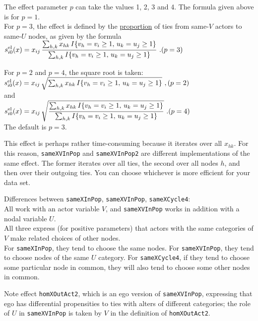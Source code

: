 \documentclass[a4paper,fleqn,11pt]{article}
\newcommand{\+}{\, + \,}
\newcommand{\vit}{\theenumi}
\newcounter{savenumi}
\begin{document}
\begin{enumerate}
 The effect parameter $p$ can take the values 1, 2, 3 and 4.
 The formula given above is for $p=1$.\\
 For $p=3$, the effect is defined by the \underline{proportion} of ties from same-$V$ actors
 to same-$U$ nodes, as given by the formula \\[0.5em]
 $\displaystyle s^{\rm el}_{i\vit}(x) =  x_{ij}\, \frac{ \sum_{h,k} x_{hk}\, I\{v_h = v_i \geq 1,\, u_k=u_j \geq 1\}}
            { \sum_{h,k} I\{v_h = v_i \geq 1,\, u_k=u_j \geq 1\}} \ . \hfill (p=3) $

 For $p=2$ and $p=4$, the square root is taken: \\[0.5em]
 $s^{\rm el}_{i\vit}(x) =  x_{ij}\, \sqrt{\sum_{h,k} x_{hk}\, I\{v_h = v_i \geq 1,\, u_k=u_j \geq 1 \}} \ ,
                 \hfill (p=2)$\\[0.3em]
 and \\[0.3em]
 $\displaystyle s^{\rm el}_{i\vit}(x) =  x_{ij}\, \sqrt{ \frac{ \sum_{h,k} x_{hk}\, I\{v_h = v_i \geq 1,\, u_k=u_j \geq 1 \}}
            { \sum_{h,k} I\{v_h = v_i \geq 1,\, u_k=u_j \geq 1 \}}}  \ . \hfill (p=4)$\\[0.3em]

The default is $p=3$.

This effect is perhaps rather time-consuming because it iterates over all $x_{hk}$.
For this reason, \texttt{sameXVInPop} and \texttt{sameXVInPop2} are different implementations
of the same effect.
The former iterates over all ties, the second over all nodes $h$, and then over their outgoing ties.
You can choose whichever is more efficient for your data set.


Differences between \texttt{sameXInPop}, \texttt{sameXVInPop}, \texttt{sameXCycle4}:\\
All work with an actor variable $V$, and \texttt{sameXVInPop} works in addition
with a nodal variable $U$.\\
All three express (for positive parameters) that actors with the same categories of $V$
make related choices of other nodes.\\
For \texttt{sameXInPop}, they tend to choose the same nodes.
For \texttt{sameXVInPop}, they tend to choose nodes of the same $U$ category.
For \texttt{sameXCycle4}, if they tend to choose some particular node in common,
they will also tend to choose some other nodes in common.

Note effect \texttt{homXOutAct2}, which is an ego version of  \texttt{sameXVInPop},
expressing that ego has differential propensities to ties with alters
of different categories; the role of $U$ in \texttt{sameXVInPop}
is taken by $V$ in the definition of \texttt{homXOutAct2}.


\setcounter{savenumi}{\value{enumi}}
\end{enumerate}
\end{document}
